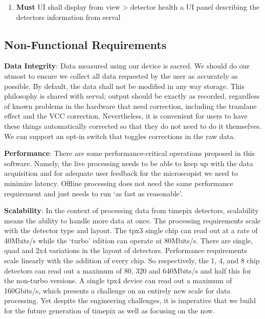 \documentclass[10pt]{article}
\newcommand{\PriorityTag}[2]{%
    \colorbox{#2!25}{\footnotesize\textsf{\textbf{#1}}}\hspace{0.6em}}
\newcommand{\must}{\leavevmode\PriorityTag{Must}{green}}
\newcounter{reqgrp}[section] %
\newcounter{reqno}
\newcommand{\reqprefix}{GEN}
\newenvironment{requirements}[1]{%
    \renewcommand{\reqprefix}{#1}%
    \refstepcounter{reqgrp}%
    \setcounter{reqno}{0}%
    \begin{enumerate}[leftmargin=*]
    }{\end{enumerate}}
\begin{document}
\begin{requirements}{UI}
        \item \must {}
        {UI shall display from view > detector health a UI panel describing the detectors information from serval}

    \end{requirements}

    \subsection{Non-Functional Requirements}

    \textbf{Data Integrity}: Data measured using our device is sacred. We should do our utmost to ensure we collect all data requested by the user as accurately as possible. By default, the data shall not be modified in any way storage. This philosophy is shared with serval; output should be exactly as recorded, regardless of known problems in the hardware that need correction, including the tramlane effect and the VCC correction. Nevertheless, it is convenient for users to have these things automatically corrected so that they do not need to do it themselves. We can support an opt-in switch that toggles corrections in the raw data.

    \textbf{Performance}: There are some performance-critical operations proposed in this software. Namely, the live processing needs to be able to keep up with the data acquisition and for adequate user feedback for the microscopist we need to minimize latency. Offline processing does not need the same performance requirement
    and just needs to run `as fast as reasonable'.

    \textbf{Scalability}: In the context of processing data from timepix detectors, scalability means the ability to handle more data at once. The processing requirements scale with the detector type and layout. The tpx3 single chip can read out at a rate of 40Mbits/s while the `turbo' edition can operate at 80Mbits/s. There are single, quad and 2x4 variations in the layout of detectors. Performance requirements scale linearly with the addition of every chip. So respectively, the 1, 4, and 8 chip detectors can read out a maximum of 80, 320 and 640Mbits/s and half this for the non-turbo versions. A single tpx4 device can read out a maximum of 160Gbits/s, which presents a challenge on an entirely new scale for data processing. Yet despite the engineering challenges, it is imperative that we build for the future generation of timepix as well as focusing on the now.
\end{document}
